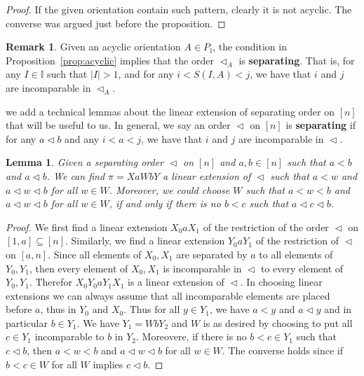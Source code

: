 \documentclass[reqno]{amsart}
\newtheorem{lemma}[theorem]{Lemma}
\theoremstyle{definition}
\newtheorem{remark}[theorem]{Remark}
\newcommand{\defn}[1]{\textbf{\textsf{\color{PineGreen} #1}}} %
\newcommand{\less}{\vartriangleleft} %
\newcommand{\II}{\mathbb I} %
\begin{document}
\begin{proof}
If the given orientation contain such pattern, clearly it is not acyclic. The converse was argued just before the proposition.
\end{proof}

\begin{remark} \label{rem:separation}
Given an acyclic orientation $A\in P_\II$,  the condition in Proposition~\ref{prop:acyclic} implies that the order $\less_A$ is \defn{separating}. That is, for any $I\in \II$ such that $|I|>1$,
and for any $i<S(I,A)<j$, we have that $i$ and $j$ are incomparable in $\less_A$. 
\end{remark}

we add a  technical lemmas about  the linear extension of separating order on $[n]$ that will be useful to us. In general, we say an order $\less$ on $[n]$ is \defn{separating} if 
for any $a\less b$ and any $i<a<j$, we have that $i$ and $j$ are incomparable in $\less$.

\begin{lemma} \label{lem:XaWbY}
Given a separating order $\less$ on $[n]$ and  $a,b\in [n]$ such that $a<b$ and $a\less b$. We can find $\pi= XaWbY$ a linear extension of $\less$ such that
$a<w$ and $a\less w\less b$ for all $w\in W$. Moreover, we could choose $W$ such that $a<w<b$ and $a\less w\less b$ for all $w\in W$, if and only if  there is no $b<c$ such that $a\less c\less b$.
\end{lemma}

\begin{proof} We first find a linear extension $X_0aX_1$ of the restriction of the order $\less$ on $[1,a]\subseteq [n]$.
Similarly, we find a linear extension $Y_0aY_1$ of the restriction of $\less$ on $[a,n]$. Since all elements of $X_0,X_1$ are separated by $a$ to all elements of $Y_0,Y_1$,
then every element of $X_0,X_1$ is incomparable in $\less$ to every element of $Y_0,Y_1$. Therefor $X_0Y_0aY_1X_1$ is a linear extension of $\less$.
In choosing linear extensions we can always assume that all incomparable elements  are placed before $a$, thus in $Y_0$ and $X_0$. 
Thus for all $y\in Y_1$, we have $a<y$ and $a\less y$ and in particular $b\in Y_1$. We have $Y_1=WbY_2$ and $W$ is as desired by choosing to put all  $c\in Y_1$ incomparable to $b$ in $Y_2$.
Moreovere, if there is no $b<c\in Y_1$ such that $c\less b$, then  $a<w<b$ and $a\less w\less b$ for all $w\in W$. The converse holds since if $b<c\in W$ for all $W$ implies $c\less b$.
\end{proof}
\end{document}
